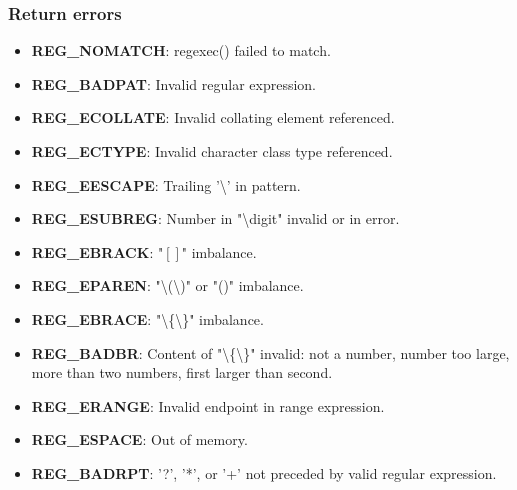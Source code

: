 \documentclass{report}
\begin{document}
    \subsubsection{Return errors}
    \bigbreak \noindent 
    \begin{itemize}
        \item \textbf{REG\_NOMATCH}: regexec() failed to match.
        \item \textbf{REG\_BADPAT}: Invalid regular expression.
        \item \textbf{REG\_ECOLLATE}: Invalid collating element referenced.
        \item \textbf{REG\_ECTYPE}: Invalid character class type referenced.
        \item \textbf{REG\_EESCAPE}: Trailing '\textbackslash' in pattern.
        \item \textbf{REG\_ESUBREG}: Number in "\textbackslash digit" invalid or in error.
        \item \textbf{REG\_EBRACK}: "$[]$" imbalance.
        \item \textbf{REG\_EPAREN}: "\textbackslash(\textbackslash)" or "()" imbalance.
        \item \textbf{REG\_EBRACE}: "\textbackslash\{\textbackslash\}" imbalance.
        \item \textbf{REG\_BADBR}: Content of "\textbackslash\{\textbackslash\}" invalid: not a number, number too large, more than two numbers, first larger than second.
        \item \textbf{REG\_ERANGE}: Invalid endpoint in range expression.
        \item \textbf{REG\_ESPACE}: Out of memory.
        \item \textbf{REG\_BADRPT}: '?', '*', or '+' not preceded by valid regular expression.
    \end{itemize}

    \bigbreak \noindent 
\end{document}
